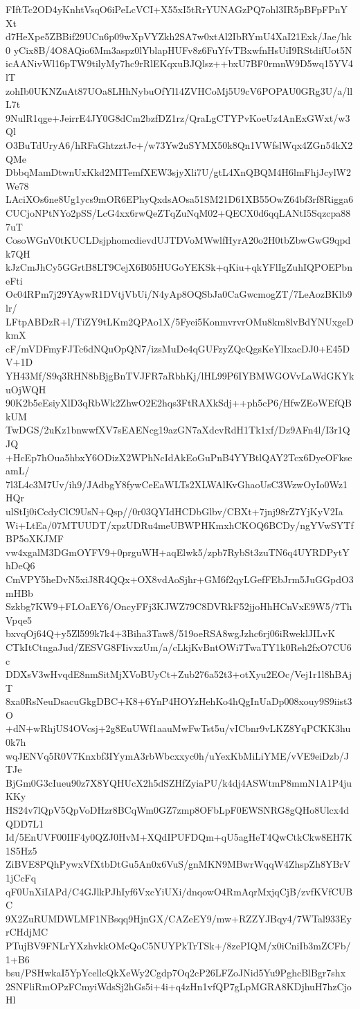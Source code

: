 FIftTc2OD4yKnhtVsqO6iPeLcVCI+X55xI5tRrYUNAGzPQ7ohl3IR5pBFpFPnYXt
d7HeXpe5ZBBif29UCn6p09wXpVYZkh2SA7w0xtAl2IbRYmU4XaI21Exk/Jae/hk0
yCix8B/4O8AQio6Mm3aspz0lYblapHUFv8z6FuYfvTBxwfnHsUiI9RStdifUot5N
icAANivWl16pTW9tilyMy7hc9rRlEKqxuBJQlsz++bxU7BF0rmnW9D5wq15YV4lT
zohIb0UKNZuAt87UOa8LHhNybuOfYl14ZVHCoMj5U9cV6POPAU0GRg3U/a/llL7t
9NulR1qge+JeirrE4JY0G8dCm2bzfDZ1rz/QraLgCTYPvKoeUz4AnExGWxt/w3Ql
O3BuTdUryA6/hRFaGhtzztJc+/w73Yw2uSYMX50k8Qn1VWfslWqx4ZGn54kX2QMe
DbbqMamDtwnUxKkd2MITemfXEW3sjyXli7U/gtL4XnQBQM4H6lmFhjJcylW2We78
LAciXOs6ne8Ug1ycs9mOR6EPhyQxdsAOsa51SM21D61XB55OwZ64bf3rf8Rigga6
CUCjoNPtNYo2pSS/LcG4xx6rwQeZTqZuNqM02+QECX0d6qqLANtI5Sqzcpa887uT
CosoWGnV0tKUCLDsjphomcdievdUJTDVoMWwlfHyrA20o2H0tbZbwGwG9qpdk7QH
kJzCmJhCy5GGrtB8LT9CejX6B05HUGoYEKSk+qKiu+qkYFlIgZuhIQPOEPbneFti
Oc04RPm7j29YAywR1DVtjVbUi/N4yAp8OQSbJa0CaGwcmogZT/7LeAozBKlb9lr/
LFtpABDzR+l/TiZY9tLKm2QPAo1X/5Fyei5KonmvrvrOMu8km8lvBdYNUxgeDkmX
cF/mVDFmyFJTc6dNQuOpQN7/izsMuDe4qGUFzyZQcQgsKeYlIxacDJ0+E45DV+1D
YH43Mf/S9q3RHN8bBjgBnTVJFR7aRbhKj/lHL99P6IYBMWGOVvLaWdGKYkuOjWQH
90K2b5eEsiyXlD3qRbWk2ZhwO2E2hqs3FtRAXkSdj++ph5cP6/HfwZEoWEfQBkUM
TwDGS/2uKz1bnwwfXV7sEAENcg19azGN7aXdcvRdH1Tk1xf/Dz9AFn4l/I3r1QJQ
+HcEp7hOua5hbxY6ODizX2WPhNcIdAkEoGuPnB4YYBtlQAY2Tcx6DyeOFkseamL/
7l3L4c3M7Uv/ih9/JAdbgY8fywCeEaWLTs2XLWAlKvGhaoUsC3WzwOyIo0Wz1HQr
ulStIj0iCcdyClC9UsN+Qsp//0r03QYIdHCDbGlbv/CBXt+7jnj98rZ7YjKyV2Ia
Wi+LtEa/07MTUUDT/xpzUDRu4meUBWPHKmxhCKOQ6BCDy/ngYVwSYTfBP5oXKJMF
vw4xgalM3DGmOYFV9+0prguWH+aqElwk5/zpb7RybSt3zuTN6q4UYRDPytYhDeQ6
CmVPY5heDvN5xiJ8R4QQx+OX8vdAoSjhr+GM6f2qyLGefFEbJrm5JuGGpdO3mHBb
Szkbg7KW9+FLOaEY6/OncyFFj3KJWZ79C8DVRkF52jjoHhHCnVxE9W5/7ThVpqe5
bxvqOj64Q+y5Zl599k7k4+3Biha3Taw8/519oeRSA8wgJzhc6rj06iRweklJILvK
CTkItCtngaJud/ZESVG8FIivxzUm/a/cLkjKvBntOWi7TwaTY1k0Reh2fxO7CU6c
DDXsV3wHvqdE8nmSitMjXVoBUyCt+Zub276a52t3+otXyu2EOc/Vej1r1l8hBAjT
8xa0RsNeuDsacuGkgDBC+K8+6YnP4HOYzHehKo4hQgInUaDp008xouy9S9iist3O
+dN+wRhjUS4OVcsj+2g8EuUWf1aauMwFwTst5u/vICbnr9vLKZ8YqPCKK3hu0k7h
wqJENVq5R0V7Knxbf3IYymA3rbWbcxxyc0h/uYexKbMiLiYME/vVE9eiDzb/JTJe
BjGm0G3cIueu90z7X8YQHUcX2h5dSZHfZyiaPU/k4dj4ASWtmP8mmN1A1P4juKKy
HS24v7lQpV5QpVoDHzr8BCqWm0GZ7zmp8OFbLpF0EWSNRG8gQHo8Ulcx4dQDD7L1
Id/5EnUVF00IIF4y0QZJ0HvM+XQdIPUFDQm+qU5agHeT4QwCtkCkw8EH7K1S5Hz5
ZiBVE8PQhPywxVfXtbDtGu5An0x6VuS/gnMKN9MBwrWqqW4ZhspZh8YBrV1jCcFq
qF0UnXiIAPd/C4GJlkPJhIyf6VxcYiUXi/dnqowO4RmAqrMxjqCjB/zvfKVfCUBC
9X2ZuRUMDWLMF1NBsqq9HjnGX/CAZeEY9/mw+RZZYJBqy4/7WTal933EyrCHdjMC
PTujBV9FNLrYXzhvkkOMcQoC5NUYPkTrTSk+/8zePIQM/x0iCniIb3mZCFb/1+B6
bsu/PSHwkaI5YpYcellcQkXeWy2Cgdp7Oq2cP26LFZoJNid5Yu9PghcBlBgr7shx
2SNFliRmOPzFCmyiWdsSj2hGs5i+4i+q4zHn1vfQP7gLpMGRA8KDjhuH7hzCjoHl

